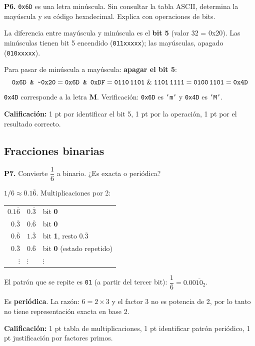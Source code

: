 \documentclass[12pt, oneside]{article}
\begin{document}
\medskip
\textbf{P6.} \texttt{0x6D} es una letra minúscula.  Sin consultar la tabla
ASCII, determina la mayúscula y su código hexadecimal.  Explica con
operaciones de bits.

\begin{notaprofesor}
  La diferencia entre mayúscula y minúscula es el \textbf{bit 5} (valor 32 = 0x20).
  Las minúsculas tienen bit 5 encendido (\texttt{011xxxxx}); las mayúsculas,
  apagado (\texttt{010xxxxx}).

  Para pasar de minúscula a mayúscula: \textbf{apagar el bit 5}:
  \[
    \texttt{0x6D \& \textasciitilde 0x20}
    = \texttt{0x6D \& 0xDF}
    = \texttt{0110\,1101} \;\&\; \texttt{1101\,1111}
    = \texttt{0100\,1101}
    = \texttt{0x4D}
  \]
  \texttt{0x4D} corresponde a la letra \textbf{M}.
  Verificación: \texttt{0x6D} es \texttt{'m'} y \texttt{0x4D} es \texttt{'M'}.
  \checkmark

  \textbf{Calificación:} 1 pt por identificar el bit 5, 1 pt por la operación,
  1 pt por el resultado correcto.
\end{notaprofesor}

\subsection{Fracciones binarias}

\textbf{P7.} Convierte $\dfrac{1}{6}$ a binario.  ¿Es exacta o periódica?

\begin{notaprofesor}
  $1/6 \approx 0.1\overline{6}$.  Multiplicaciones por 2:
  \begin{center}
  \begin{tabular}{r@{$\;\times 2 =\;$}ll}
    $0.1\overline{6}$ & $0.\overline{3}$  & bit \textbf{0} \\
    $0.\overline{3}$  & $0.\overline{6}$  & bit \textbf{0} \\
    $0.\overline{6}$  & $1.\overline{3}$  & bit \textbf{1}, resto $0.\overline{3}$ \\
    $0.\overline{3}$  & $0.\overline{6}$  & bit \textbf{0} \quad (estado repetido) \\
    $\vdots$          & $\vdots$          & $\vdots$ \\
  \end{tabular}
  \end{center}
  El patrón que se repite es \texttt{01} (a partir del tercer bit):
  $\dfrac{1}{6} = 0.00\overline{10}_2$.

  Es \textbf{periódica}.  La razón: $6 = 2 \times 3$ y el factor 3 no es
  potencia de 2, por lo tanto no tiene representación exacta en base 2.

  \textbf{Calificación:} 1 pt tabla de multiplicaciones, 1 pt identificar patrón
  periódico, 1 pt justificación por factores primos.
\end{notaprofesor}
\end{document}
